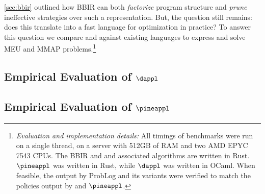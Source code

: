 \cref{sec:bbir} outlined how BBIR can both \textit{factorize} program
structure and \textit{prune} ineffective strategies over such a representation.
But, the question still remains: does this translate into a fast
language for optimization in practice?
To answer this question we compare \dappl{} and \pineappl{} against
existing languages to express and solve MEU and MMAP problems.\footnote{\emph{Evaluation and implementation details:} All timings of
benchmarks were run on a single thread,
on a server with 512GB of RAM and two AMD EPYC 7543
CPUs.
The BBIR and and associated algorithms are written in Rust.
$\pineappl$ was written in Rust, while $\dappl$ was written in OCaml.
When feasible, the output by ProbLog and its variants
were verified to match the policies output by \dappl{} and $\pineappl$.
}

\subsection{Empirical Evaluation of $\dappl$}\label{subsec:dappl-eval}



\subsection{Empirical Evaluation of $\pineappl$}
